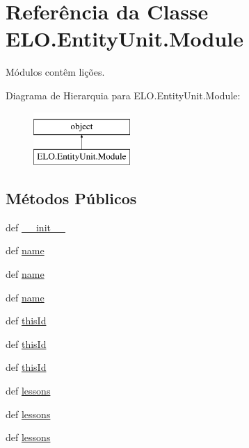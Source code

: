 \hypertarget{classELO_1_1EntityUnit_1_1Module}{\section{Referência da Classe E\-L\-O.\-Entity\-Unit.\-Module}
\label{db/de8/classELO_1_1EntityUnit_1_1Module}
}


Módulos contêm lições.  


Diagrama de Hierarquia para E\-L\-O.\-Entity\-Unit.\-Module\-:\begin{figure}[H]
\begin{center}
\leavevmode
\includegraphics[height=2.000000cm]{db/de8/classELO_1_1EntityUnit_1_1Module}
\end{center}
\end{figure}
\subsection*{Métodos Públicos}
\begin{DoxyCompactItemize}
\item 
def \hyperlink{classELO_1_1EntityUnit_1_1Module_ae99b8d113f1b21fcac85063ba5599e35}{\-\_\-\-\_\-init\-\_\-\-\_\-}
\item 
def \hyperlink{classELO_1_1EntityUnit_1_1Module_aacb77acc28005833928a7c6f971f44b5}{name}
\item 
def \hyperlink{classELO_1_1EntityUnit_1_1Module_aacb77acc28005833928a7c6f971f44b5}{name}
\item 
def \hyperlink{classELO_1_1EntityUnit_1_1Module_aacb77acc28005833928a7c6f971f44b5}{name}
\item 
def \hyperlink{classELO_1_1EntityUnit_1_1Module_a7833604c3c13e2fdc5f4bce8712c2118}{this\-Id}
\item 
def \hyperlink{classELO_1_1EntityUnit_1_1Module_a7833604c3c13e2fdc5f4bce8712c2118}{this\-Id}
\item 
def \hyperlink{classELO_1_1EntityUnit_1_1Module_a7833604c3c13e2fdc5f4bce8712c2118}{this\-Id}
\item 
def \hyperlink{classELO_1_1EntityUnit_1_1Module_a4b12f83ecbf3722070716c9ca5adb80a}{lessons}
\item 
def \hyperlink{classELO_1_1EntityUnit_1_1Module_a4b12f83ecbf3722070716c9ca5adb80a}{lessons}
\item 
def \hyperlink{classELO_1_1EntityUnit_1_1Module_a4b12f83ecbf3722070716c9ca5adb80a}{lessons}
\end{DoxyCompactItemize}
